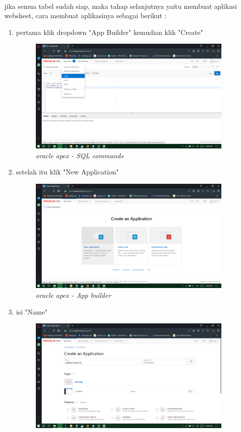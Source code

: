 \documentclass[12pt]{ociamthesis}  %
\begin{document}
\paragraph{}
jika semua tabel sudah siap, maka tahap selanjutnya yaitu membuat aplikasi websheet, cara membuat aplikasinya sebagai berikut :
\begin{enumerate}
	\item pertama klik dropdown "App Builder" kemudian klik "Create"
	\begin{figure}[H]
    \centering
	\includegraphics[width=10cm]{figures/create app/Screenshot (234).png} 
    \caption{\textit{oracle apex - SQL commands}}
    \label{foto21}
 	\end{figure}
	\item setelah itu klik "New Application"
	\begin{figure}[H]
    \centering
	\includegraphics[width=10cm]{figures/create app/Screenshot (235).png} 
    \caption{\textit{oracle apex - App builder}}
    \label{foto21}
 	\end{figure}
	\item isi "Name"
	\begin{figure}[H]
    \centering
	\includegraphics[width=10cm]{figures/create app/Screenshot (244).png} 

\end{figure}
\end{enumerate}
\end{document}
